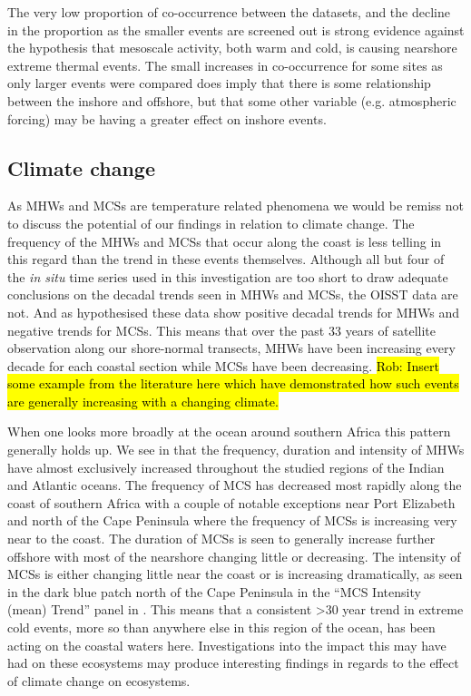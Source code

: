 \documentclass[a4paper,10pt,review]{elsarticle}
\begin{document}
The very low proportion of co-occurrence between the datasets, and the decline in the proportion as the smaller events are screened out is strong evidence against the hypothesis that mesoscale activity, both warm and cold, is causing nearshore extreme thermal events. The small increases in co-occurrence for some sites as only larger events were compared does imply that there is some relationship between the inshore and offshore, but that some other variable (e.g. atmospheric forcing) may be having a greater effect on inshore events.

\subsection{Climate change}
As MHWs and MCSs are temperature related phenomena we would be remiss not to discuss the potential of our findings in relation to climate change. The frequency of the MHWs and MCSs that occur along the coast is less telling in this regard than the trend in these events themselves. Although all but four of the \emph{in situ} time series used in this investigation are too short to draw adequate conclusions on the decadal trends seen in MHWs and MCSs, the OISST data are not. And as hypothesised these data show positive decadal trends for MHWs and negative trends for MCSs. This means that over the past 33 years of satellite observation along our shore-normal transects, MHWs have been increasing every decade for each coastal section while MCSs have been decreasing. \hl{Rob: Insert some example from the literature here which have demonstrated how such events are generally increasing with a changing climate.}

When one looks more broadly at the ocean around southern Africa this pattern generally holds up. We see in  that the frequency, duration and intensity of MHWs have almost exclusively increased throughout the studied regions of the Indian and Atlantic oceans. The frequency of MCS has decreased most rapidly along the coast of southern Africa with a couple of notable exceptions near Port Elizabeth and north of the Cape Peninsula where the frequency of MCSs is increasing very near to the coast. The duration of MCSs is seen to generally increase further offshore with most of the nearshore changing little or decreasing. The intensity of MCSs is either changing little near the coast or is increasing dramatically, as seen in the dark blue patch north of the Cape Peninsula in the ``MCS Intensity (mean) Trend'' panel in . This means that a consistent >30 year trend in extreme cold events, more so than anywhere else in this region of the ocean, has been acting on the coastal waters here. Investigations into the impact this may have had on these ecosystems may produce interesting findings in regards to the effect of climate change on ecosystems.
\end{document}
